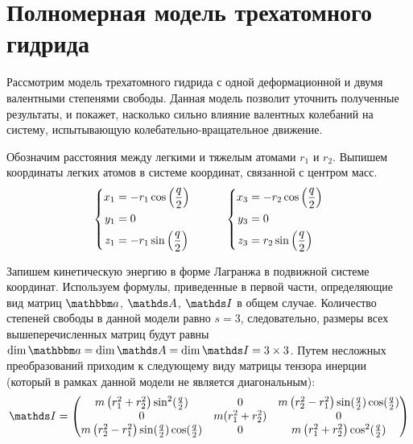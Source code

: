 \section{Полномерная модель трехатомного гидрида}

Рассмотрим модель трехатомного гидрида с одной деформационной и двумя валентными степенями свободы. Данная модель позволит уточнить полученные результаты, и покажет, насколько сильно влияние валентных колебаний на систему, испытывающую колебательно-вращательное движение. \par 
Обозначим расстояния между легкими и тяжелым атомами $r_1$ и $r_2$. Выпишем координаты легких атомов в системе координат, связанной с центром масс.
\vverh
\begin{gather}
\left\{
\begin{aligned}
x_1 &= - r_1 \cos \left( \frac{q}{2} \right) \\
y_1 &= 0 \\
z_1 &= - r_1 \sin \left( \frac{q}{2} \right) 
\end{aligned}
\right. \quad \quad \quad
\left\{
\begin{aligned}
x_3 &= - r_2 \cos \left( \frac{q}{2} \right) \\
y_3 &= 0 \\
z_3 &= r_2 \sin \left( \frac{q}{2} \right)
\end{aligned}
\right.\notag
\end{gather}

Запишем кинетическую энергию в форме Лагранжа в подвижной системе координат. Используем формулы, приведенные в первой части, определяющие вид матриц $\bba$, $\bbA$, $\bbI$ в общем случае. Количество степеней свободы в данной модели равно $s = 3$, следовательно, размеры всех вышеперечисленных матриц будут равны $\dim \bba = \dim \bbA = \dim \bbI = 3 \times 3$. Путем несложных преобразований приходим к следующему виду матрицы тензора инерции (который в рамках данной модели не является диагональным):
\vverh
\begin{gather}
\bbI = \begin{pmatrix}
m \left( r_1^2 + r_2^2 \right) \sin^2 (\frac{q}{2}) & 0 & m \left( r_2^2 - r_1^2 \right) \sin (\frac{q}{2}) \cos(\frac{q}{2}) \\
0 & m (r_1^2 + r_2^2) & 0 \\
m \left( r_2^2 - r_1^2 \right) \sin(\frac{q}{2}) \cos(\frac{q}{2}) & 0 & m \left( r_1^2 + r_2^2 \right) \cos^2 (\frac{q}{2})
\end{pmatrix} \notag
\end{gather}

